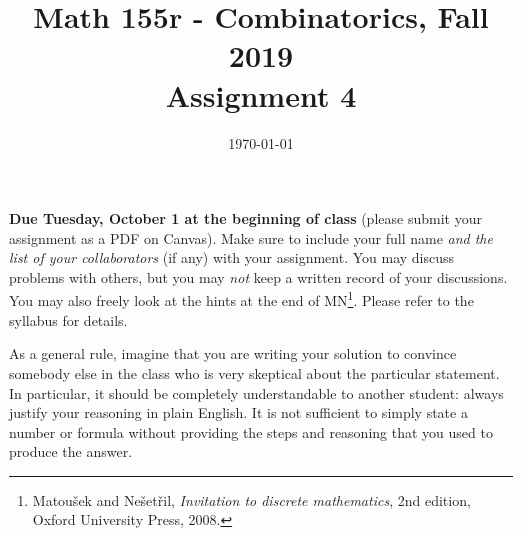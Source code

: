 \documentclass{amsart}
\title[Math 155r, Fall 2019: assignment 4]{Math 155r - Combinatorics, Fall 2019 \\ Assignment 4}
\date{\today}
\theoremstyle{definition}
\begin{document}

\vspace*{-10em}
\maketitle

\textbf{Due Tuesday, October 1 at the beginning of class} (please submit your assignment as a PDF on Canvas). Make sure to include your full name \emph{and the list of your collaborators} (if any) with your assignment. You may discuss problems with others, but you may \emph{not} keep a written record of your discussions. You may also freely look at the hints at the end of MN\footnote{Matoušek and Nešetřil, \emph{Invitation to discrete mathematics}, 2nd edition, Oxford University Press, 2008.}. Please refer to the syllabus for details.

As a general rule, imagine that you are writing your solution to convince somebody else in the class who is very skeptical about the particular statement. In particular, it should be completely understandable to another student: always justify your reasoning in plain English. It is not sufficient to simply state a number or formula without providing the steps and reasoning that you used to produce the answer.
\end{document}
